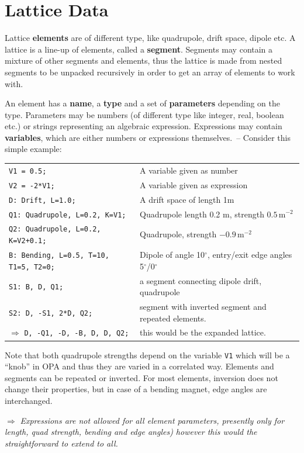\documentclass[12pt]{article}
\newcommand{\degree}{\mbox{$^{\circ}$}}
\newcommand\todo[1]{$\Longrightarrow$ {\em #1} }
\begin{document}
\section{Lattice Data}
Lattice {\bf elements} are of different type, like quadrupole, drift space, dipole etc. 
A lattice is a line-up of elements, called a {\bf segment}. Segments may contain a mixture of other segments and elements, thus the lattice is made from nested segments to be unpacked recursively in order to get an array of elements to work with.

An element has a {\bf name}, a {\bf type} and a set of {\bf parameters} depending on the type.
Parameters  may be numbers (of different type like integer, real, boolean etc.) or strings representing an algebraic expression. Expressions may contain {\bf variables}, which are either numbers or expressions themselves.~--
Consider this simple example:

{\small \begin{tabular}{ll}
{\tt V1 = 0.5;}  & A variable given as number \\
{\tt V2 = -2*V1;}  & A variable given as expression \\
{\tt D: Drift, L=1.0;} & A drift space of length 1m \\
{\tt Q1: Quadrupole, L=0.2, K=V1;} & Quadrupole length 0.2 m, strength $0.5\,$m$^{-2}$ \\
{\tt Q2: Quadrupole, L=0.2, K=V2+0.1;} & Quadrupole, strength $-0.9\,$m$^{-2}$  \\
{\tt B: Bending, L=0.5, T=10, T1=5, T2=0;} & Dipole of angle 10\degree, entry/exit edge angles 5\degree/0\degree \\
{\tt S1: B, D, Q1;} & a segment connecting dipole drift, quadrupole\\
{\tt S2: D, -S1, 2*D, Q2;} & segment with inverted segment and repeated elements.\\
$\Longrightarrow$ {\tt D, -Q1, -D, -B, D, D, Q2;} & this would be the expanded lattice.
\end{tabular}
}

Note that both quadrupole strengths depend on the variable {\tt V1} which will be a ``knob'' in OPA and thus they are varied in a correlated way. Elements and segments can be repeated or inverted. For most elements, inversion does not change their properties, but in case of a bending magnet, edge angles are interchanged.

\todo{Expressions are not allowed for all element parameters, presently only for length, quad strength, bending and edge angles) however this would the straightforward to extend to all.}\\
\end{document}
